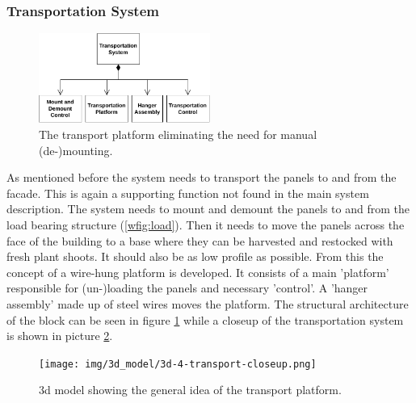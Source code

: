 \subsubsection{Transportation System}
\begin{figure}
	\caption{The transport platform eliminating the need for manual (de-)mounting.}
	\label{wfig:transport}
	\includegraphics[width=0.5\textwidth]{img/architecture/transport.pdf}
\end{figure} 
As mentioned before the system needs to transport the panels to and from the facade.
This is again a supporting function not found in the main system description.
The system needs to mount and demount the panels to and from the load bearing structure (\ref{wfig:load}).
Then it needs to move the panels across the face of the building to a base where they can be harvested and restocked with fresh plant shoots.
It should also be as low profile as possible.
From this the concept of a wire-hung platform is developed.
It consists of a main 'platform' responsible for (un-)loading the panels and necessary 'control'.
A 'hanger assembly' made up of steel wires moves the platform.
The structural architecture of the block can be seen in figure \ref{wfig:transport} while a closeup of the transportation system is shown in picture \ref{fig:3d-transport}.

\begin{figure}[htbp]
  \centering
  \caption{3d model showing the general idea of the transport platform.}
  \label{fig:3d-transport}
  \texttt{[image: img/3d\_model/3d-4-transport-closeup.png]}
\end{figure}

